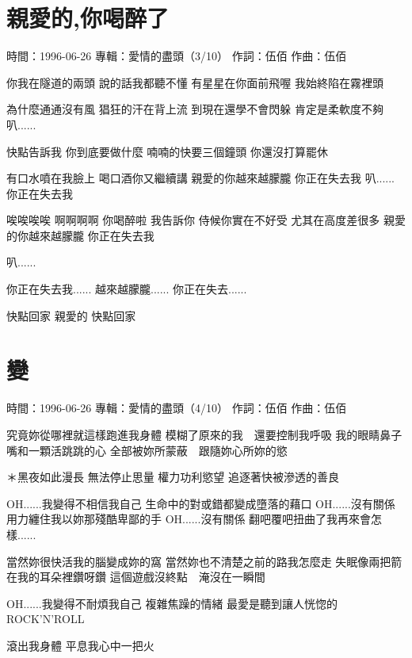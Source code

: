 \documentclass[UTF8,a4paper,oneside,twocolumn,12pt]{ctexbook}
\newcommand{\infopair}[2]{\textbullet #1：#2}
\newcommand{\zc}[1][伍佰]{\infopair{作詞}{#1}}
\newcommand{\zq}[1][伍佰]{\infopair{作曲}{#1}}
\newcommand{\zj}[1]{\infopair{專輯}{#1}}
\newcommand{\sj}[1]{\infopair{時間}{#1}}
\newenvironment{info}{\begin{flushleft}\kaishu
	}
	{\end{flushleft}\normalsize\yahei\par}
\newenvironment{lyric}{
	}
{}
\begin{document}
\section{親愛的,你喝醉了}
\begin{info}
	\sj{1996-06-26}
	\zj{愛情的盡頭（3/10）}
	\zc
	\zq
\end{info}
\begin{lyric}
	你我在隧道的兩頭
	說的話我都聽不懂
	有星星在你面前飛喔
	我始終陷在霧裡頭

	為什麼通通沒有風
	猖狂的汗在背上流
	到現在還學不會閃躲
	肯定是柔軟度不夠
	叭......

	快點告訴我
	你到底要做什麼
	喃喃的快要三個鐘頭
	你還沒打算罷休

	有口水噴在我臉上
	喝口酒你又繼續講
	親愛的你越來越朦朧
	你正在失去我
	叭......
	你正在失去我

	唉唉唉唉
	啊啊啊啊
	你喝醉啦
	我告訴你
	侍候你實在不好受
	尤其在高度差很多
	親愛的你越來越朦朧
	你正在失去我

	叭......

	你正在失去我......
	越來越朦朧......
	你正在失去......

	快點回家 親愛的
	快點回家
\end{lyric}

\section{變}
\begin{info}
	\sj{1996-06-26}
	\zj{愛情的盡頭（4/10）}
	\zc
	\zq
\end{info}
\begin{lyric}
	究竟妳從哪裡就這樣跑進我身體
	模糊了原來的我　還要控制我呼吸
	我的眼睛鼻子嘴和一顆活跳跳的心
	全部被妳所蒙蔽　跟隨妳心所妳的慾

	＊黑夜如此漫長
	無法停止思量
	權力功利慾望
	追逐著快被滲透的善良

	OH......我變得不相信我自己
	生命中的對或錯都變成墮落的藉口
	OH......沒有關係
	用力纏住我以妳那殘酷卑鄙的手
	OH......沒有關係
	翻吧覆吧扭曲了我再來會怎樣......

	當然妳很快活我的腦變成妳的窩
	當然妳也不清楚之前的路我怎麼走
	失眠像兩把箭在我的耳朵裡鑽呀鑽
	這個遊戲沒終點　淹沒在一瞬間

	OH......我變得不耐煩我自己
	複雜焦躁的情緒
	最愛是聽到讓人恍惚的ROCK'N'ROLL

	滾出我身體
	平息我心中一把火
\end{lyric}
\end{document}
